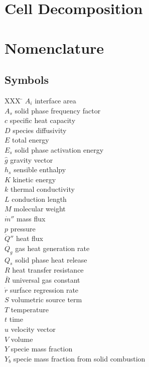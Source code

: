 \documentclass{article}
\renewcommand{\vec}[1]{\ensuremath{\hat{#1}}}
\begin{document}
    \section{Cell Decomposition}
    \label{sec:decomp}

    \section*{Nomenclature}
    \begin{multicols}{2}
      \subsection*{Symbols}
        \begin{tabbing}
          XXX \= \kill
          $A_i$ \> interface area \\
          $A_s$ \> solid phase frequency factor \\
          $c$ \>  specific heat capacity \\
          $D$ \> species diffusivity \\
          $E$ \> total energy \\
          $E_s$ \> solid phase activation energy \\
          $\vec{g}$ \> gravity vector \\
          $h_s$ \> sensible enthalpy \\
          $K$ \> kinetic energy \\
          $k$ \> thermal conductivity \\
          $L$ \> conduction length \\
          $M$ \> molecular weight \\
          $\dot{m}''$ \> mass flux \\
          $p$ \> pressure \\
          $\dot{Q}''$ \> heat flux \\
          $\dot{Q_g}$ \> gas heat generation rate \\
          $Q_s$ \> solid phase heat release \\
          $R$ \> heat transfer resistance \\
          $\bar{R}$ \> universal gas constant \\
          $\dot{r}$ \> surface regression rate \\
          $S$ \> volumetric source term \\
          $T$ \> temperature \\
          $t$ \> time \\
          $\vec{u}$ \> velocity vector \\
          $V$ \> volume \\
          $Y$ \> specie mass fraction \\
          $Y_b$ \> specie mass fraction from solid combustion
        \end{tabbing}

\end{multicols}
\end{document}
